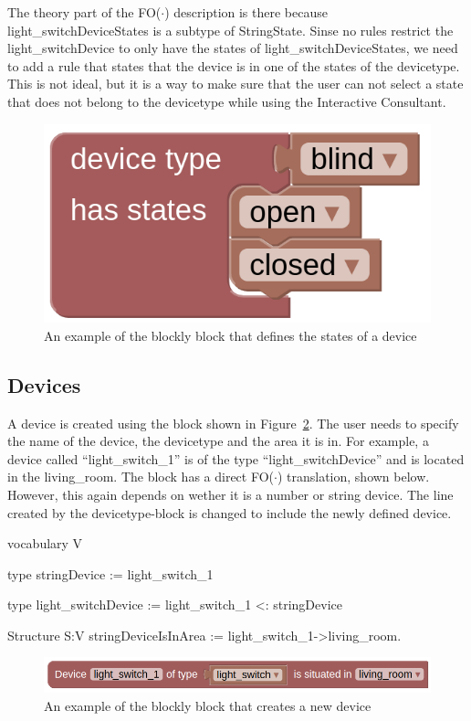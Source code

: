 \documentclass[11pt,a4paper]{report}
\newcommand{\fodot}{FO($\cdot$)\xspace}
\begin{document}
The theory part of the \fodot description is there because light\_switchDeviceStates is a subtype of StringState. Sinse no rules restrict the light\_switchDevice to only have the states of light\_switchDeviceStates, we need to add a rule that states that the device is in one of the states of the devicetype. This is not ideal, but it is a way to make sure that the user can not select a state that does not belong to the devicetype while using the Interactive Consultant.

\begin{figure}
    \centering
    \includegraphics[width=0.4\linewidth]{images/homy_device_type.png}
    \caption{An example of the blockly block that defines the states of a device}
    \label{fig:homy_device_type}
\end{figure}

\subsection{Devices}
A device is created using the block shown in Figure~\ref{fig:homy_device}. The user needs to specify the name of the device, the devicetype and the area it is in. For example, a device called ``light\_switch_1'' is of the type ``light\_switchDevice'' and is located in the living\_room. The block has a direct \fodot translation, shown below. However, this again depends on wether it is a number or string device. The line created by the devicetype-block is changed to include the newly defined device.

\begin{idplisting}
vocabulary V {
    type stringDevice := {light_switch_1} 

    type light_switchDevice := {light_switch_1} <: stringDevice
}

Structure S:V {
    stringDeviceIsInArea := {light_switch_1->living_room}.
}
\end{idplisting}

\begin{figure}
    \centering
    \includegraphics[width=0.8\linewidth]{images/homy_device.png}
    \caption{An example of the blockly block that creates a new device}
    \label{fig:homy_device}
\end{figure}
\end{document}
